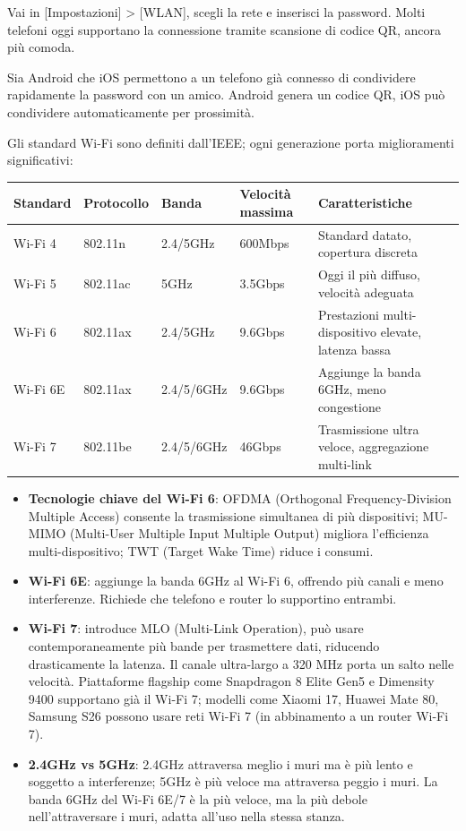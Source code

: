 
Vai in [Impostazioni] > [WLAN], scegli la rete e inserisci la password. Molti telefoni oggi supportano la connessione tramite scansione di codice QR, ancora più comoda.


Sia Android che iOS permettono a un telefono già connesso di condividere rapidamente la password con un amico. Android genera un codice QR, iOS può condividere automaticamente per prossimità.


Gli standard Wi-Fi sono definiti dall'IEEE; ogni generazione porta miglioramenti significativi:

\begin{center}
\begin{tabularx}{\linewidth}{|X|X|X|X|X|}
\hline
\textbf{Standard} & \textbf{Protocollo} & \textbf{Banda} & \textbf{Velocità massima} & \textbf{Caratteristiche} \tabularnewline
\hline
Wi-Fi 4 & 802.11n & 2.4/5GHz & 600Mbps & Standard datato, copertura discreta \tabularnewline
Wi-Fi 5 & 802.11ac & 5GHz & 3.5Gbps & Oggi il più diffuso, velocità adeguata \tabularnewline
Wi-Fi 6 & 802.11ax & 2.4/5GHz & 9.6Gbps & Prestazioni multi-dispositivo elevate, latenza bassa \tabularnewline
Wi-Fi 6E & 802.11ax & 2.4/5/6GHz & 9.6Gbps & Aggiunge la banda 6GHz, meno congestione \tabularnewline
Wi-Fi 7 & 802.11be & 2.4/5/6GHz & 46Gbps & Trasmissione ultra veloce, aggregazione multi-link \tabularnewline
\hline
\end{tabularx}
\end{center}

\begin{itemize}
  \item \textbf{Tecnologie chiave del Wi-Fi 6}: OFDMA (Orthogonal Frequency-Division Multiple Access) consente la trasmissione simultanea di più dispositivi; MU-MIMO (Multi-User Multiple Input Multiple Output) migliora l'efficienza multi-dispositivo; TWT (Target Wake Time) riduce i consumi.
  \item \textbf{Wi-Fi 6E}: aggiunge la banda 6GHz al Wi-Fi 6, offrendo più canali e meno interferenze. Richiede che telefono e router lo supportino entrambi.
  \item \textbf{Wi-Fi 7}: introduce MLO (Multi-Link Operation), può usare contemporaneamente più bande per trasmettere dati, riducendo drasticamente la latenza. Il canale ultra-largo a 320 MHz porta un salto nelle velocità. Piattaforme flagship come Snapdragon 8 Elite Gen5 e Dimensity 9400 supportano già il Wi-Fi 7; modelli come Xiaomi 17, Huawei Mate 80, Samsung S26 possono usare reti Wi-Fi 7 (in abbinamento a un router Wi-Fi 7).
  \item \textbf{2.4GHz vs 5GHz}: 2.4GHz attraversa meglio i muri ma è più lento e soggetto a interferenze; 5GHz è più veloce ma attraversa peggio i muri. La banda 6GHz del Wi-Fi 6E/7 è la più veloce, ma la più debole nell'attraversare i muri, adatta all'uso nella stessa stanza.
\end{itemize}

